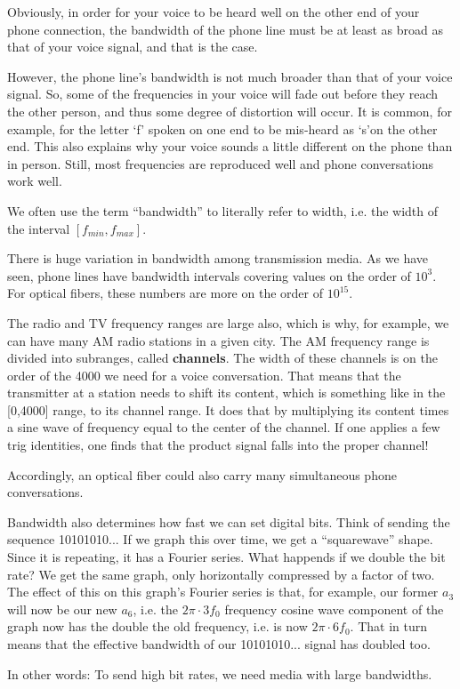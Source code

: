 Obviously, in order for your voice to be heard well on the other end
of your phone connection, the bandwidth of the phone line must be
at least as broad as that of your voice signal, and that is the case.

However, the phone line's bandwidth is not much broader than that
of your voice signal. So, some of the frequencies in your voice will
fade out before they reach the other person, and thus some degree
of distortion will occur. It is common, for example, for the letter
`f' spoken on one end to be mis-heard as `s'on the other end. This
also explains why your voice sounds a little different on the phone
than in person. Still, most frequencies are reproduced well and phone
conversations work well.

We often use the term ``bandwidth'' to literally refer to width,
i.e. the width of the interval $[f_{min},f_{max}]$.

There is huge variation in bandwidth among transmission media. As we
have seen, phone lines have bandwidth intervals covering values on the
order of $10^{3}$.  For optical fibers, these numbers are more on the
order of $10^{15}$.  

The radio and TV frequency ranges are large also, which is why, for
example, we can have many AM radio stations in a given city.  The
AM frequency range is divided into subranges, called {\bf channels}.
The width of these channels is on the order of the 4000 we need for a
voice conversation.  That means that the transmitter at a station needs
to shift its content, which is something like in the [0,4000] range, to
its channel range.  It does that by multiplying its content times a sine
wave of frequency equal to the center of the channel.  If one applies a
few trig identities, one finds that the product signal falls into the
proper channel!

Accordingly, an optical fiber could also carry many simultaneous phone
conversations.

Bandwidth also determines how fast we can set digital bits. Think of
sending the sequence 10101010...  If we graph this over time, we get a
``squarewave'' shape.  Since it is repeating, it has a Fourier series.
What happends if we double the bit rate?  We get the same graph, only
horizontally compressed by a factor of two.  The effect of this on this
graph's Fourier series is that, for example, our former $a_3$ will now
be our new $a_6$, i.e. the $2 \pi \cdot 3 f_0$ frequency cosine wave
component of the graph now has the double the old frequency, i.e. is now
$2 \pi \cdot 6 f_0$.  That in turn means that the effective bandwidth of
our 10101010... signal has doubled too.

In other words:  To send high bit rates, we need media with large
bandwidths.


